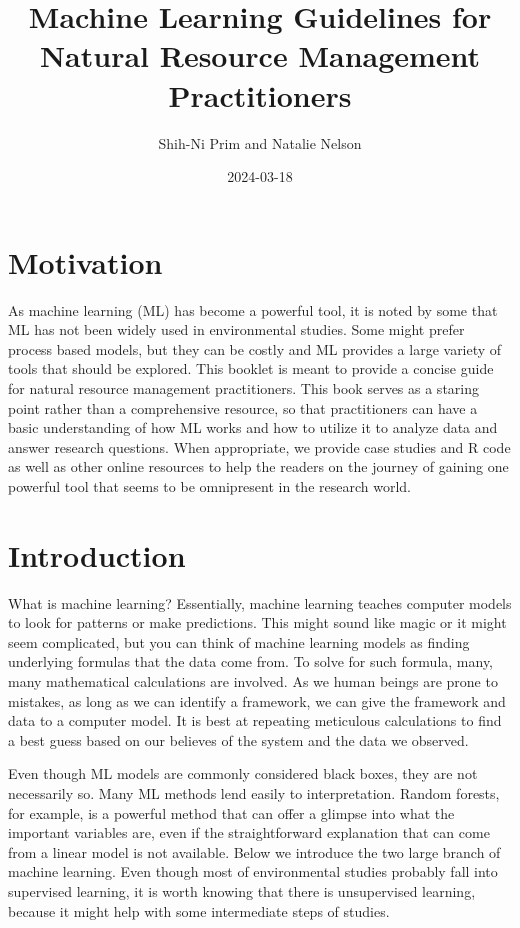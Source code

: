 \documentclass[
]{book}
\title{Machine Learning Guidelines for Natural Resource Management Practitioners}
\author{Shih-Ni Prim and Natalie Nelson}
\date{2024-03-18}
\begin{document}
\maketitle

{
\setcounter{tocdepth}{1}
\tableofcontents
}
\hypertarget{motivation}{%
\chapter{Motivation}\label{motivation}}

As machine learning (ML) has become a powerful tool, it is noted by some that ML has not been widely used in environmental studies. Some might prefer process based models, but they can be costly and ML provides a large variety of tools that should be explored. This booklet is meant to provide a concise guide for natural resource management practitioners. This book serves as a staring point rather than a comprehensive resource, so that practitioners can have a basic understanding of how ML works and how to utilize it to analyze data and answer research questions. When appropriate, we provide case studies and R code as well as other online resources to help the readers on the journey of gaining one powerful tool that seems to be omnipresent in the research world.

\hypertarget{intro}{%
\chapter{Introduction}\label{intro}}

What is machine learning? Essentially, machine learning teaches computer models to look for patterns or make predictions. This might sound like magic or it might seem complicated, but you can think of machine learning models as finding underlying formulas that the data come from. To solve for such formula, many, many mathematical calculations are involved. As we human beings are prone to mistakes, as long as we can identify a framework, we can give the framework and data to a computer model. It is best at repeating meticulous calculations to find a best guess based on our believes of the system and the data we observed.

Even though ML models are commonly considered black boxes, they are not necessarily so. Many ML methods lend easily to interpretation. Random forests, for example, is a powerful method that can offer a glimpse into what the important variables are, even if the straightforward explanation that can come from a linear model is not available. Below we introduce the two large branch of machine learning. Even though most of environmental studies probably fall into supervised learning, it is worth knowing that there is unsupervised learning, because it might help with some intermediate steps of studies.
\end{document}
